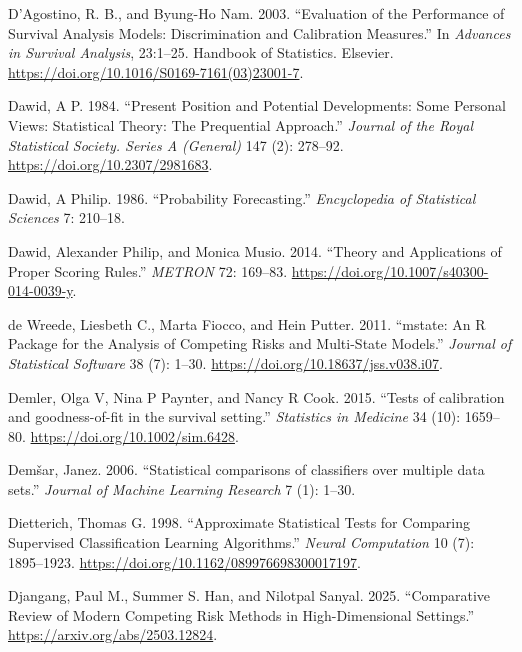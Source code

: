 \documentclass[
  letterpaper,
  krantz2]{style/krantz}
\newlength{\cslhangindent}
\newenvironment{CSLReferences}[2] %
 {\begin{list}{}{%
  \setlength{\itemindent}{0pt}
  \setlength{\leftmargin}{0pt}
  \setlength{\parsep}{0pt}
  \ifodd #1
   \setlength{\leftmargin}{\cslhangindent}
   \setlength{\itemindent}{-1\cslhangindent}
  \fi
  \setlength{\itemsep}{#2\baselineskip}}}
 {\end{list}}
\begin{document}
\begin{CSLReferences}{1}{0}
D'Agostino, R. B., and Byung-Ho Nam. 2003. {``Evaluation of the
Performance of Survival Analysis Models: Discrimination and Calibration
Measures.''} In \emph{Advances in Survival Analysis}, 23:1--25. Handbook
of Statistics. Elsevier.
\url{https://doi.org/10.1016/S0169-7161(03)23001-7}.

Dawid, A P. 1984. {``{Present Position and Potential Developments: Some
Personal Views: Statistical Theory: The Prequential Approach}.''}
\emph{Journal of the Royal Statistical Society. Series A (General)} 147
(2): 278--92. \url{https://doi.org/10.2307/2981683}.

Dawid, A Philip. 1986. {``{Probability Forecasting}.''}
\emph{Encyclopedia of Statistical Sciences} 7: 210--18.

Dawid, Alexander Philip, and Monica Musio. 2014. {``Theory and
Applications of Proper Scoring Rules.''} \emph{METRON} 72: 169--83.
\url{https://doi.org/10.1007/s40300-014-0039-y}.

de Wreede, Liesbeth C., Marta Fiocco, and Hein Putter. 2011.
{``{mstate}: An {R} Package for the Analysis of Competing Risks and
Multi-State Models.''} \emph{Journal of Statistical Software} 38 (7):
1--30. \url{https://doi.org/10.18637/jss.v038.i07}.

Demler, Olga V, Nina P Paynter, and Nancy R Cook. 2015. {``{Tests of
calibration and goodness-of-fit in the survival setting}.''}
\emph{Statistics in Medicine} 34 (10): 1659--80.
\url{https://doi.org/10.1002/sim.6428}.

Demšar, Janez. 2006. {``{Statistical comparisons of classifiers over
multiple data sets}.''} \emph{Journal of Machine Learning Research} 7
(1): 1--30.

Dietterich, Thomas G. 1998. {``{Approximate Statistical Tests for
Comparing Supervised Classification Learning Algorithms}.''}
\emph{Neural Computation} 10 (7): 1895--1923.
\url{https://doi.org/10.1162/089976698300017197}.

Djangang, Paul M., Summer S. Han, and Nilotpal Sanyal. 2025.
{``Comparative Review of Modern Competing Risk Methods in
High-Dimensional Settings.''} \url{https://arxiv.org/abs/2503.12824}.


\end{CSLReferences}
\end{document}
